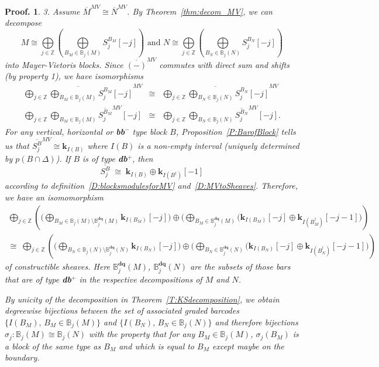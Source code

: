 \documentclass[a4paper, english, 11pt]{article}
\newcommand{\kk}[0]{\textbf{k}}
\newcommand{\0}{\vec{0}}
\newcommand{\Z}[0]{\mathbb{Z}}
\newtheorem*{pf}{Proof.} }
\begin{document}
\begin{pf}
3. Assume $\overline{M}^{MV} \cong \overline{N}^{MV}$. By Theorem~\ref{thm:decom_MV}, we can decompose 
$$M\cong \mathop{\bigoplus}\limits_{j\in \Z} \left(\mathop{\bigoplus}\limits_{B_M \in \mathbb{B}_j(M)}S_j^{B_M}[-j]\right) \mbox{ and }
N \cong  \mathop{\bigoplus}\limits_{j\in \Z} \left(\mathop{\bigoplus}\limits_{B_N \in \mathbb{B}_j(N)}S_j^{B_N}[-j]\right)$$ into  Mayer-Vietoris blocks.
Since $\overline{(-)}^{MV}$ commutes with direct 
sum and shifts (by property 1),  we have isomorphisms
\begin{eqnarray*}
 \overline{ \bigoplus_{j\in \Z} \bigoplus_{B_M\in \mathbb{B}_j(M)}S_j^{B_M}[-j]}^{MV} &\cong&
 \overline{\bigoplus_{j\in \Z} \bigoplus_{B_N\in \mathbb{B}_j(N)}S_j^{B_N}[-j] }^{MV}  \\ 
 \bigoplus_{j\in \Z} \bigoplus_{B_M\in \mathbb{B}_j(M)} \overline{S_j^{B_M}}^{MV}[-j] &\cong& 
 \bigoplus_{j\in \Z} \bigoplus_{B_N\in \mathbb{B}_j(N)} \overline{S_j^{B_N} }^{MV}[-j].
\end{eqnarray*}
For any vertical, horizontal or \textbf{bb}$^-$ type block $B$, Proposition~\ref{P:BarofBlock} tells us that  
$\overline{S_j^{B}}^{MV} \cong \kk_{I(B)}$ where $I(B)$ is a non-empty interval (uniquely determined by $p(B\cap \Delta)$). 
If $B$ is of type \textbf{db}$^{+}$, then 
$$
 \overline{S_j^{B}} \; \cong \;  \kk_{I(B)} \oplus \kk_{I(B^\dag)}[-1]
$$
according to definition~\ref{D:blocksmodulesforMV} and~\ref{D:MVtoSheaves}.  
Therefore, we have an isomomorphism 
\begin{multline}
 \label{eq:decofBarMV}  
 \bigoplus_{j\in \Z} \left(\Big(\bigoplus_{B_M\in \mathbb{B}_j(M)\setminus \mathbb{B}^{\textbf{dq}}_j(M)} \kk_{I(B_M)}[-j] \Big) \oplus 
 \Big(\bigoplus_{B_M\in \mathbb{B}^{\textbf{dq}}_j(M) } \big(\kk_{I(B_M)}[-j] \oplus \kk_{I(B_M^\dag)}[-j-1]\Big)\right)\\
 \cong \; 
 \bigoplus_{j\in \Z} \left(\Big(\bigoplus_{B_N\in \mathbb{B}_j(N) \setminus \mathbb{B}^{\textbf{dq}}_j(N)} \kk_{I(B_N)}[-j]\Big)\oplus 
\Big( \bigoplus_{B_N\in \mathbb{B}^{\textbf{dq}}_j(N) } \big(\kk_{I(B_N)}[-j] \oplus \kk_{I(B_N^\dag)}[-j-1]\Big)\right)   
\end{multline}
of constructible sheaves. Here $\mathbb{B}^{\textbf{dq}}_j(M)$, $\mathbb{B}^{\textbf{dq}}_j(N) $ are the subsets of those bars that are of type \textbf{db}$^{+}$ in the respective decompositions of $M$ and $N$. 

By unicity of the decomposition in Theorem~\ref{T:KSdecomposition}, we obtain  degreewise bijections between 
the set of associated graded barcodes $\{ I(B_M), \, B_M \in  \mathbb{B}_j(M)\}$ and $\{ I(B_N), \, B_N \in  \mathbb{B}_j(N)\}$
and therefore  bijections $\sigma_j: \mathbb{B}_j(M) \cong \mathbb{B}_j(N)$ with the property that  for any $B_M\in \mathbb{B}_j(M)$, 
$\sigma_j(B_M)$ is a block of the same type as $B_M$ and which is equal to $B_M$ except maybe on the boundary.




\end{pf}
\end{document}
